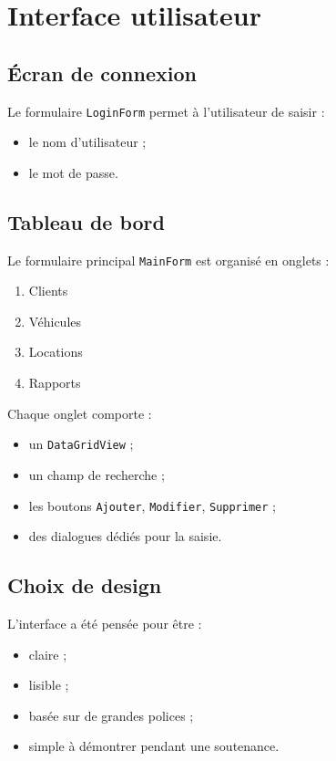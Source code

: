 \documentclass[12pt,a4paper]{report}
\begin{document}
\chapter{Interface utilisateur}
\section{Écran de connexion}
Le formulaire \texttt{LoginForm} permet à l'utilisateur de saisir :
\begin{itemize}[leftmargin=1.2cm]
    \item le nom d'utilisateur ;
    \item le mot de passe.
\end{itemize}

\section{Tableau de bord}
Le formulaire principal \texttt{MainForm} est organisé en onglets :
\begin{enumerate}[leftmargin=1.2cm]
    \item Clients
    \item Véhicules
    \item Locations
    \item Rapports
\end{enumerate}

Chaque onglet comporte :
\begin{itemize}[leftmargin=1.2cm]
    \item un \texttt{DataGridView} ;
    \item un champ de recherche ;
    \item les boutons \texttt{Ajouter}, \texttt{Modifier}, \texttt{Supprimer} ;
    \item des dialogues dédiés pour la saisie.
\end{itemize}

\section{Choix de design}
L'interface a été pensée pour être :
\begin{itemize}[leftmargin=1.2cm]
    \item claire ;
    \item lisible ;
    \item basée sur de grandes polices ;
    \item simple à démontrer pendant une soutenance.
\end{itemize}
\end{document}
